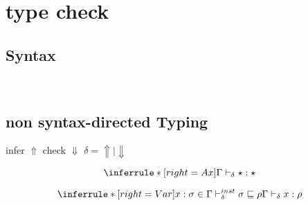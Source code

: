 \section{type check}

\subsection{Syntax}
\gram{\otte\ottinterrule
      \ottS\ottinterrule
      \ottR\ottinterrule
  }
\\[2.0mm]


\subsection{non syntax-directed Typing}

\newcommand{\pgm}{\mathsf{P}}
\newcommand{\nat}{\mathsf{nat}}
\newcommand{\logic}{\mathsf{L}}
\newcommand{\judge}{\Gamma\vdash}

\newcommand{\checktype}{\Gamma\vdash_\Downarrow}
\newcommand{\infertype}{\Gamma\vdash_\Uparrow}
\newcommand{\infercheck}{\Gamma\vdash_\delta}

\newcommand{\checktypeno}{\vdash_\Downarrow}
\newcommand{\infertypeno}{\vdash_\Uparrow}
\newcommand{\infercheckno}{\vdash_\delta}

\newcommand{\instinfer}{\vdash^{inst}_\Uparrow}
\newcommand{\instcheck}{\vdash^{inst}_\Downarrow}
\newcommand{\instinfercheck}{\vdash^{inst}_\delta}

\newcommand{\polyinfer}{\vdash^{poly}_\Uparrow}
\newcommand{\polycheck}{\vdash^{poly}_\Downarrow}
\newcommand{\polyinfercheck}{\vdash^{poly}_\delta}

\newcommand{\polymorphic}{\vdash^{dsk}}


\framebox{$ \judge e : \sigma$ } infer $\Uparrow$ check $\Downarrow$ $\delta = \Uparrow \mid \Downarrow$

\[
\inferrule*[right=Ax]
{} {\infercheck \star : \star}
\]

\[
\inferrule*[right=Var]
{x:\sigma \in \Gamma \\ \instinfercheck \sigma \sqsubseteq \rho } {\infercheck x : \rho}
\]


